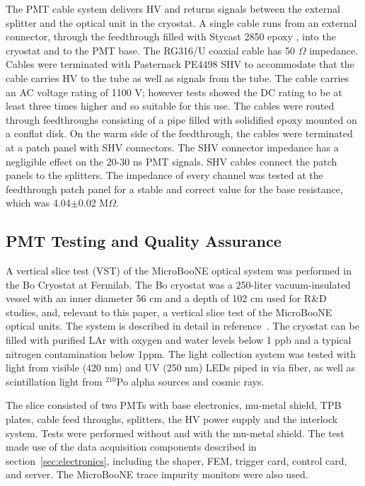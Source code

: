 The PMT cable system delivers HV and returns signals between the external splitter and the optical unit in the cryostat.   A single cable runs from an external connector, through the feedthrough filled with Stycast 2850 epoxy \cite{stycast}, into the cryostat and to the PMT base. The RG316/U coaxial cable has 50 $\Omega$ impedance.  Cables were terminated with Pasternack PE4498 SHV to accommodate that the cable carries HV to the tube as well as signals from the tube.
The cable carries an AC voltage rating of 1100 V; however tests showed the DC rating to be at least three times higher and so suitable for this use.  The cables were routed through feedthroughs consisting of a pipe filled with solidified epoxy mounted on a conflat disk.  On the warm side of the feedthrough, the cables were terminated at a patch panel with SHV connectors. The SHV connector impedance has a negligible effect on the 20-30 ns PMT signals.  SHV cables connect the patch panels to the splitters.  The impedance of every channel was tested at the feedthrough patch panel for a stable and correct value for the base resistance, which was 4.04$\pm$0.02 M$\Omega$. 

\subsection{PMT Testing and Quality Assurance}

A vertical slice test (VST) of the MicroBooNE optical system was performed in the Bo Cryostat at Fermilab.  The Bo cryostat was a 250-liter vacuum-insulated vessel with an inner diameter 56 cm and a depth of 102 cm used for R\&D studies, and, relevant to this paper, a vertical slice test of the MicroBooNE optical units.  The system is described in detail in reference~\cite{Jones:2015bya}.  The cryostat can be filled with purified LAr with oxygen and water levels below 1 ppb and a typical nitrogen contamination below 1ppm.  The light collection system was tested with light from visible (420 nm) and UV (250 nm) LEDs piped in via fiber, as well as scintillation light from $^{210}$Po alpha sources and cosmic rays.

The slice consisted of two PMTs with base electronics, mu-metal shield, TPB plates,  cable feed throughs, splitters, the HV power supply and the interlock system.   Tests were performed without and with the mu-metal shield.   The test made use of the data acquisition components described in section~\ref{sec:electronics}, including the shaper, FEM, trigger card, control card, and server.  The MicroBooNE trace impurity monitors were also used.

